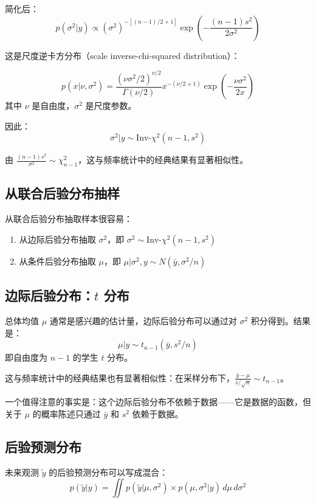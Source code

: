 简化后：
\[
p(\sigma^2 | y) \propto (\sigma^2)^{-[(n-1)/2+1]} \exp\left(-\frac{(n-1)s^2}{2\sigma^2}\right)
\]

这是尺度逆卡方分布（scale inverse-chi-squared distribution）：

\begin{Definition}[尺度逆卡方分布]
  \[
  p(x|\nu, \sigma^2) = \frac{(\nu\sigma^2/2)^{\nu/2}}{\Gamma(\nu/2)} x^{-(\nu/2+1)} \exp\left(-\frac{\nu\sigma^2}{2x}\right)
  \]
  其中 $\nu$ 是自由度，$\sigma^2$ 是尺度参数。
\end{Definition}

因此：
\[
\sigma^2 | y \sim \text{Inv-}\chi^2(n-1, s^2)
\]

由 $\frac{(n-1)s^2}{\sigma^2} \sim \chi_{n-1}^2$，这与频率统计中的经典结果有显著相似性。

\subsection{从联合后验分布抽样}

从联合后验分布抽取样本很容易：
\begin{enumerate}
  \item 从边际后验分布抽取 $\sigma^2$，即 $\sigma^2 \sim \text{Inv-}\chi^2(n-1, s^2)$
  \item 从条件后验分布抽取 $\mu$，即 $\mu | \sigma^2, y \sim N(\bar{y}, \sigma^2/n)$
\end{enumerate}

\subsection{边际后验分布：$t$ 分布}

总体均值 $\mu$ 通常是感兴趣的估计量，边际后验分布可以通过对 $\sigma^2$ 积分得到。结果是：
\[
\mu | y \sim t_{n-1}(\bar{y}, s^2/n)
\]
即自由度为 $n-1$ 的学生 $t$ 分布。

这与频率统计中的经典结果也有显著相似性：在采样分布下，$\frac{\bar{y}-\mu}{s/\sqrt{n}} \sim t_{n-1}$。

一个值得注意的事实是：这个边际后验分布不依赖于数据——它是数据的函数，但关于 $\mu$ 的概率陈述只通过 $\bar{y}$ 和 $s^2$ 依赖于数据。

\subsection{后验预测分布}

未来观测 $\tilde{y}$ 的后验预测分布可以写成混合：
\[
p(\tilde{y} | y) = \iint p(\tilde{y}|\mu, \sigma^2) \times p(\mu, \sigma^2 | y) \, d\mu \, d\sigma^2
\]

